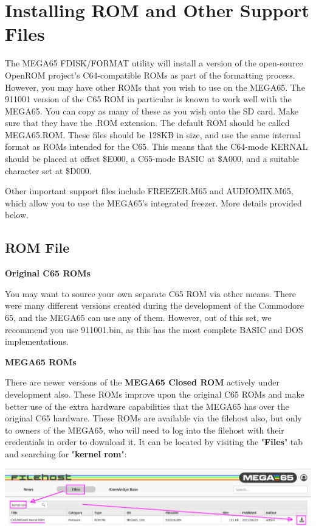 \section{Installing ROM and Other Support Files}
\label{sec:installingrometc}

The MEGA65 FDISK/FORMAT utility will install a version of the
open-source OpenROM project's C64-compatible ROMs as part of the
formatting process. However, you may have other ROMs that you wish to
use on the MEGA65. The 911001 version of the C65 ROM in
particular is known to work well with the MEGA65.
You can copy as many of these as you wish onto the
SD card.  Make sure that they have the .ROM extension.  The default ROM
should be called MEGA65.ROM.  These files
should be 128KB in size, and use the same internal format as ROMs
intended for the C65.  This means that the C64-mode KERNAL should be
placed at offset \$E000, a C65-mode BASIC at \$A000, and a suitable
character set at \$D000.  

Other important support files include FREEZER.M65 and AUDIOMIX.M65, which
allow you to use the MEGA65's integrated freezer. More details provided below. 

\subsection{ROM File}

\textbf{Original C65 ROMs}

You may want to source your own separate C65 ROM via other means.  There were many different versions created during the development of the Commodore 65,
and the MEGA65 can use any of them.  However, out of this set, we recommend you use 911001.bin, as this has the most complete BASIC and DOS implementations.

\textbf{MEGA65 ROMs}

There are newer versions of the \textbf{MEGA65 Closed ROM} actively under development also. These ROMs improve upon the original C65 ROMs and make better use of the extra hardware capabilities that the MEGA65 has over the original C65 hardware. These ROMs are available via the filehost also, but only to owners of the MEGA65, who will need to log into the filehost with their credentials in order to download it. It can be located by visiting the "\textbf{Files}" tab and searching for "\textbf{kernel rom}":

\includegraphics[width=\linewidth]{images/latest_closed_rom.png}

